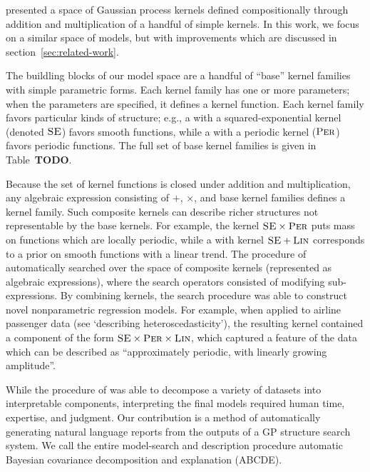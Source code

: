 \documentclass[letterpaper]{article}
\newcommand{\procedurename}{ABCDE}
\begin{document}
\citet{DuvLloGroetal13} presented a space of Gaussian process kernels defined compositionally through addition and multiplication of a handful of simple kernels.
In this work, we focus on a similar space of models, but with improvements which are discussed in section~\ref{sec:related-work}. 

The buildling blocks of our model space are a handful of ``base'' kernel families with simple parametric forms. Each kernel family has one or more parameters; when the parameters are specified, it defines a kernel function. Each kernel family favors particular kinds of structure; e.g., a \gp{} with a squared-exponential kernel (denoted ${\textsc{SE}}$) favors smooth functions, while a \gp{} with a periodic kernel (${\textsc{Per}}$) favors periodic functions. The full set of base kernel families is given in Table~{\bf TODO}.

Because the set of kernel functions is closed under addition and multiplication, any algebraic expression consisting of $+$, $\times$, and base kernel families defines a kernel family. 
Such composite kernels can describe richer structures not representable by the base kernels.
For example, the kernel ${\textsc{SE}} \times {\textsc{Per}}$ puts mass on functions which are locally periodic, while a \gp{} with kernel ${\textsc{SE}} + {\textsc{Lin}}$ corresponds to a prior on smooth functions with a linear trend. The procedure of \citet{DuvLloGroetal13} automatically searched over the space of composite kernels (represented as algebraic expressions), where the search operators consisted of modifying sub-expressions. 
By combining kernels, the search procedure was able to construct novel nonparametric regression models.
For example, when applied to airline passenger data (see `describing heteroscedasticity'), the resulting kernel contained a component of the form ${\textsc{SE}} \times {\textsc{Per}} \times {\textsc{Lin}}$, which captured a feature of the data which can be described as ``approximately periodic, with linearly growing amplitude''.

While the procedure of \citet{DuvLloGroetal13} was able to decompose a variety of datasets into interpretable components, interpreting the final models required human time, expertise, and judgment. Our contribution is a method of automatically generating natural language reports from the outputs of a GP structure search system.
%
We call the entire model-search and description procedure automatic Bayesian covariance decomposition and explanation (\procedurename{}).


\end{document}
